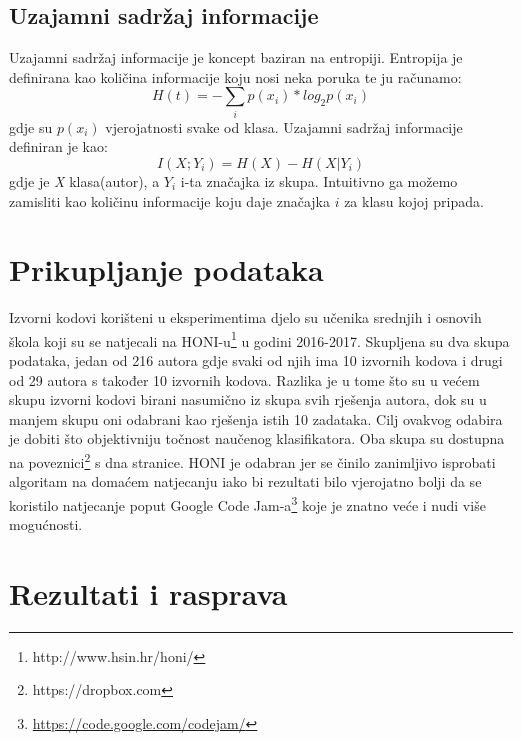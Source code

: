 \subsection{Uzajamni sadržaj informacije} \label{entropy}

Uzajamni sadržaj informacije je koncept baziran na entropiji. Entropija je definirana kao količina informacije koju nosi neka poruka te ju računamo:
\begin{equation}
		H(t) = - \sum_{i} p(x_{i}) * log_2 p(x_{i})
\end{equation}
gdje su $p(x_{i})$ vjerojatnosti svake od klasa. \newline
Uzajamni sadržaj informacije definiran je kao:
\begin{equation}
		I(X;Y_{i}) = H(X) - H(X | Y_{i})
\end{equation}
gdje je \textit{X} klasa(autor), a $Y_{i}$ i-ta značajka iz skupa. Intuitivno ga možemo zamisliti kao količinu informacije koju daje značajka $i$ za klasu kojoj pripada.

\section{Prikupljanje podataka}
Izvorni kodovi korišteni u eksperimentima djelo su učenika srednjih i osnovih škola koji su se natjecali na HONI-u\footnote{http://www.hsin.hr/honi/} u godini 2016-2017. Skupljena su dva skupa podataka, jedan od 216 autora gdje svaki od njih ima 10 izvornih kodova i drugi od 29 autora s također 10 izvornih kodova. Razlika je u tome što su u većem skupu izvorni kodovi birani nasumično iz skupa svih rješenja autora, dok su u manjem skupu oni odabrani kao rješenja istih 10 zadataka. Cilj ovakvog odabira  je dobiti što objektivniju točnost naučenog klasifikatora. Oba skupa su dostupna na poveznici\footnote{https://dropbox.com} s dna stranice. HONI je odabran jer se činilo zanimljivo isprobati algoritam na domaćem natjecanju iako bi rezultati bilo vjerojatno bolji da se koristilo natjecanje poput Google Code Jam-a\footnote{\url{https://code.google.com/codejam/}} koje je znatno veće i nudi više mogućnosti. 

\section{Rezultati i rasprava} \label{results}

